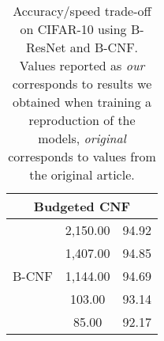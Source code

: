 \begin{table}[h]
\begin{tabular}{|c||cc|}
\multicolumn{3}{|c|}{Budgeted CNF}                                               \\ \hline
\multirow{5}{*}{B-CNF}        & 2,150.00           & 94.92                       \\
                              & 1,407.00           & 94.85                       \\
                              & 1,144.00           & 94.69                       \\
                              & 103.00             & 93.14                       \\
                              & 85.00              & 92.17                       \\ \hline
\end{tabular}
\caption{Accuracy/speed trade-off on CIFAR-10 using B-ResNet and B-CNF. Values reported as \textit{our} corresponds to results we obtained when training a reproduction of the models, \textit{original} corresponds to values from the original article.}
\label{cif10_allmodels_flop}
\end{table}